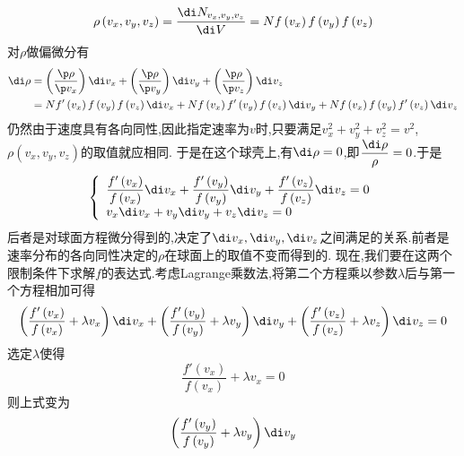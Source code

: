 \documentclass{ctexart}
\begin{document}
\begin{derivation}
    \begin{equation}
        \rho\left(v_x,v_y,v_z\right)=\dfrac{\di N_{v_x,v_y,v_z}}{\di V}=Nf\left(v_x\right)f\left(v_y\right)f\left(v_z\right)
    \end{equation}
    对$\rho$做偏微分有
    \begin{equation}
        \begin{aligned}
            \di\rho
        &= \left(\dfrac{\p\rho}{\p v_x}\right)\di v_x+\left(\dfrac{\p\rho}{\p v_y}\right)\di v_y+\left(\dfrac{\p\rho}{\p v_z}\right)\di v_z \\
        &= Nf'\left(v_x\right)f\left(v_y\right)f\left(v_z\right)\di v_x+Nf\left(v_x\right)f'\left(v_y\right)f\left(v_z\right)\di v_y+Nf\left(v_x\right)f\left(v_y\right)f'\left(v_z\right)\di v_z
        \end{aligned}
    \end{equation}
    仍然由于速度具有各向同性,因此指定速率为$v$时,只要满足$v_x^2+v_y^2+v_z^2=v^2$,$\rho\left(v_x,v_y,v_z\right)$的取值就应相同.%
    于是在这个球壳上,有$\di\rho=0$,即$\dfrac{\di\rho}{\rho}=0$.于是
    \begin{equation}
        \left\{\begin{array}{l}
            \dfrac{f'\left(v_x\right)}{f\left(v_x\right)}\di v_x+\dfrac{f'\left(v_y\right)}{f\left(v_y\right)}\di v_y+\dfrac{f'\left(v_z\right)}{f\left(v_z\right)}\di v_z=0 \\
            v_x\di v_x+v_y\di v_y+v_z\di v_z=0
        \end{array}\right.
    \end{equation}
    后者是对球面方程微分得到的,决定了$\di v_x,\di v_y,\di v_z$之间满足的关系.前者是速率分布的各向同性决定的$\rho$在球面上的取值不变而得到的.%
    现在,我们要在这两个限制条件下求解$f$的表达式.考虑Lagrange乘数法,将第二个方程乘以参数$\lambda$后与第一个方程相加可得
    \begin{equation}
        \left(\dfrac{f'\left(v_x\right)}{f\left(v_x\right)}+\lambda v_x\right)\di v_x
        +\left(\dfrac{f'\left(v_y\right)}{f\left(v_y\right)}+\lambda v_y\right)\di v_y
        +\left(\dfrac{f'\left(v_z\right)}{f\left(v_z\right)}+\lambda v_z\right)\di v_z=0
    \end{equation}
    选定$\lambda$使得
    \begin{equation}
        \dfrac{f'\left(v_x\right)}{f\left(v_x\right)}+\lambda v_x=0
    \end{equation}
    则上式变为
    \begin{equation}
        \left(\dfrac{f'\left(v_y\right)}{f\left(v_y\right)}+\lambda v_y\right)\di v_y

\end{equation}
\end{derivation}
\end{document}
